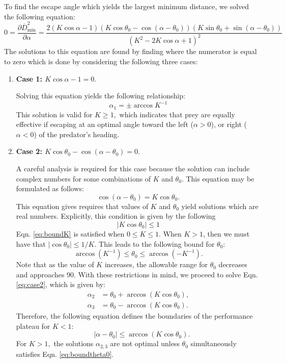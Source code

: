 \documentclass[12pt]{article}
\def\d{\partial}
\newcommand{\ol}{\overline}
\begin{document}
To find the escape angle which yields the largest minimum distance, we solved the following equation:
%
\begin{equation}
0 = \frac{\d \ol{D}^2_{\text{min}}}{\d \alpha} = 
\frac{2(K \cos \alpha - 1)(K\cos \theta_0 - \cos(\alpha - \theta_0))(K\sin \theta_0 + \sin(\alpha -\theta_0))}
{(K^2 - 2K \cos \alpha + 1)^2}
\end{equation} 
%
The solutions to this equation are found by finding where the numerator is equal to zero which is done by considering the following three cases:
%
\begin{enumerate}
\item[]{\bf Case 1: $K \cos \alpha - 1 = 0.$} 

Solving this equation yields the following relationship:
\begin{equation}
\alpha_1 = \pm \arccos K^{-1}
\end{equation}
This solution is valid for $K\geq1,$ which indicates that prey are equally effective if escaping at an optimal angle toward the left ($\alpha>0$), or right ($\alpha<0$) of the predator's heading. 

\item[]{\bf Case 2: $K\cos \theta_0 - \cos(\alpha - \theta_0) = 0.$} 

A careful analysis is required for this case because the solution can include complex numbers for some combinations of $K$ and $\theta_0.$ 
This equation may be formulated as follows: 
%
\begin{equation}
\cos(\alpha - \theta_0) = K\cos \theta_0.
\label{eq:case2}
\end{equation}
%
This equation gives requires that values of $K$ and $\theta_0$ yield solutions which are real numbers. 
Explicitly, this condition is given by the following
%
\begin{equation}
 | K\cos \theta_0 | \leq 1
 \label{eq:boundK}
\end{equation}
%
Eqn. \ref{eq:boundK} is satisfied when $0 \leq K \leq1$. When $K > 1$, then we must have that $| \cos \theta_0| \leq 1/K.$ This leads to the following bound for $\theta_0$:
%
\begin{equation}
\arccos (K^{-1}) \leq \theta_0 \leq \arccos (-K^{-1}).
\label{eq:boundtheta0}
\end{equation}
%
Note that as the value of $K$ increases, the allowable range for $\theta_0$ decreases and approaches 90\textdegree. 
With these restrictions in mind, we proceed to solve Eqn. \ref{eq:case2}, which is given by:
%
\begin{align*}
\alpha_2 & = \theta_0 + \arccos(K \cos \theta_0), \\
\alpha_3 & = \theta_0 - \arccos(K \cos \theta_0).
\end{align*}
%
Therefore,  the following equation defines the boundaries of the performance plateau for $K<1:$ 
%
\begin{equation}
\quad |\alpha - \theta_0|  \leq    \arccos(K \cos  \theta_0).
 \end{equation}
%
For $K>1,$ the solutions $\alpha_{2,3}$ are not optimal unless $\theta_0$ simultaneously satisfies Eqn. \ref{eq:boundtheta0}. 


\end{enumerate}
\end{document}
